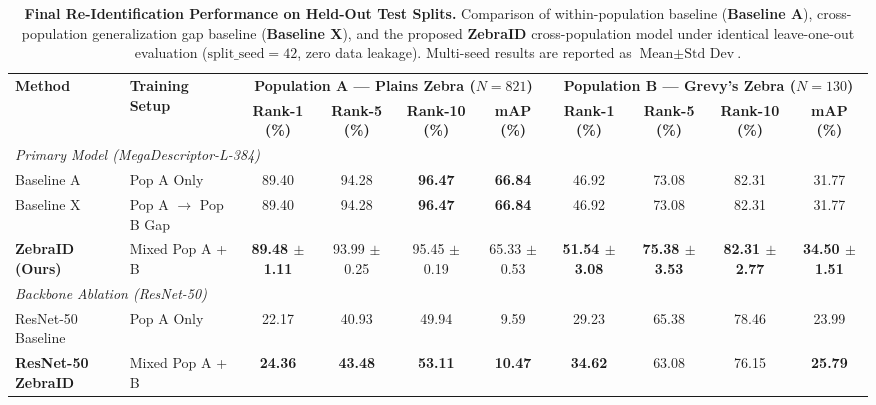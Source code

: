 \begin{table}[t]
\centering
\small
\caption{\textbf{Final Re-Identification Performance on Held-Out Test Splits.} Comparison of within-population baseline (\textbf{Baseline A}), cross-population generalization gap baseline (\textbf{Baseline X}), and the proposed \textbf{ZebraID} cross-population model under identical leave-one-out evaluation ($\text{split\_seed}=42$, zero data leakage). Multi-seed results are reported as $\text{Mean} \pm \text{Std Dev}$.}
\label{tab:final_comparison}
\begin{tabular}{llcccccccc}
\toprule
\multirow{2}{*}{\textbf{Method}} & \multirow{2}{*}{\textbf{Training Setup}} & \multicolumn{4}{c}{\textbf{Population A — Plains Zebra ($N=821$)}} & \multicolumn{4}{c}{\textbf{Population B — Grevy's Zebra ($N=130$)}} \\
\cmidrule(lr){3-6} \cmidrule(lr){7-10}
& & \textbf{Rank-1 (\%)} & \textbf{Rank-5 (\%)} & \textbf{Rank-10 (\%)} & \textbf{mAP (\%)} & \textbf{Rank-1 (\%)} & \textbf{Rank-5 (\%)} & \textbf{Rank-10 (\%)} & \textbf{mAP (\%)} \\
\midrule
\multicolumn{10}{l}{\textit{Primary Model (MegaDescriptor-L-384)}} \\
Baseline A & Pop A Only & 89.40 & 94.28 & \textbf{96.47} & \textbf{66.84} & 46.92 & 73.08 & 82.31 & 31.77 \\
Baseline X & Pop A $\rightarrow$ Pop B Gap & 89.40 & 94.28 & \textbf{96.47} & \textbf{66.84} & 46.92 & 73.08 & 82.31 & 31.77 \\
\textbf{ZebraID (Ours)} & Mixed Pop A + B & \textbf{89.48 $\pm$ 1.11} & 93.99 $\pm$ 0.25 & 95.45 $\pm$ 0.19 & 65.33 $\pm$ 0.53 & \textbf{51.54 $\pm$ 3.08} & \textbf{75.38 $\pm$ 3.53} & \textbf{82.31 $\pm$ 2.77} & \textbf{34.50 $\pm$ 1.51} \\
\midrule
\multicolumn{10}{l}{\textit{Backbone Ablation (ResNet-50)}} \\
ResNet-50 Baseline & Pop A Only & 22.17 & 40.93 & 49.94 & 9.59 & 29.23 & 65.38 & 78.46 & 23.99 \\
\textbf{ResNet-50 ZebraID} & Mixed Pop A + B & \textbf{24.36} & \textbf{43.48} & \textbf{53.11} & \textbf{10.47} & \textbf{34.62} & 63.08 & 76.15 & \textbf{25.79} \\
\bottomrule
\end{tabular}
\end{table}
